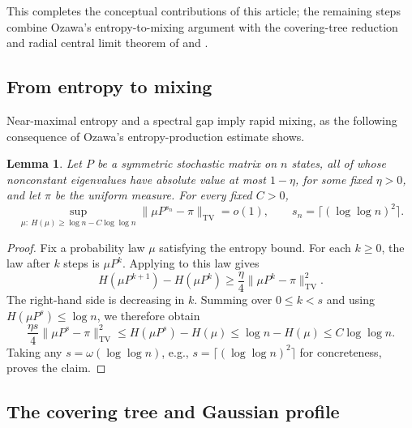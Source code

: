 \documentclass[11pt,reqno]{amsart}
\newtheorem{lemma}[theorem]{Lemma}
\theoremstyle{definition}
\newcommand{\TV}{\mathrm{TV}}
\begin{document}
This completes the conceptual contributions of this article; the remaining
steps combine Ozawa's entropy-to-mixing argument with the covering-tree
reduction and radial central limit theorem of
\cite[Sections~2.3 and~5.2]{LS} and \cite[Section~2.1]{LP}. 

\subsection{From entropy to mixing}\label{sec:profile}
Near-maximal entropy and a spectral gap imply rapid mixing, as the
following consequence of Ozawa's entropy-production estimate shows.

\begin{lemma}\label{lem:smoothing}
Let $P$ be a symmetric stochastic matrix on $n$ states, all of whose
nonconstant eigenvalues have absolute value at most $1-\eta$, for
some fixed $\eta>0$, and let $\pi$ be the uniform measure. For every fixed $C > 0$,
\[
 \sup_{\mu:\ H(\mu)\ge\log n-C\log\log n}
 \|\mu P^{s_n}-\pi\|_{\TV}=o(1),
 \qquad s_n=\lceil (\log\log n)^2\rceil.
\]
\end{lemma}

\begin{proof}
Fix a probability law $\mu$ satisfying the entropy bound.
For each $k\ge0$, the law after $k$ steps is $\mu P^k$.
Applying \cite[Lemma~2]{Ozawa} to this law gives
\[
 H(\mu P^{k+1})-H(\mu P^k)
 \ge\frac\eta4\|\mu P^k-\pi\|_{\TV}^2.
\]
The right-hand side is decreasing in $k$. Summing over $0\le k<s$ and using $H(\mu P^s)\le\log n$,
we therefore obtain
\[
 \frac{\eta s}{4}\|\mu P^s-\pi\|_{\TV}^2
 \le H(\mu P^s)-H(\mu)
 \le\log n-H(\mu)
 \le C\log\log n.
\]
Taking any $s=\omega(\log\log n)$, e.g., $s = \lceil (\log \log n)^2 \rceil$ for concreteness, proves the claim.
\end{proof}



\subsection{The covering tree and Gaussian profile}
\end{document}
